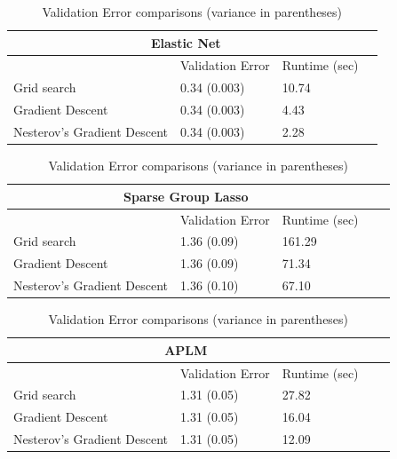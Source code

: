 \documentclass[10pt,letterpaper]{article}
\begin{document}
\begin{table} 
\begin{center}

\begin{tabular}{| l | l | l | l | }
\hline
\multicolumn{3}{|c|}{Elastic Net}\\
\hline
 & Validation Error & Runtime (sec) \\
\hline
Grid search & 0.34 (0.003) & 10.74\\
\hline
Gradient Descent & 0.34 (0.003) & 4.43 \\
\hline
Nesterov's Gradient Descent & 0.34 (0.003) & 2.28 \\
\hline
\end{tabular}


\begin{tabular}{| l | l | l | l | l | }
\hline
\multicolumn{3}{|c|}{Sparse Group Lasso}\\
\hline
 & Validation Error & Runtime (sec) \\
\hline
Grid search & 1.36 (0.09) & 161.29 \\
\hline
Gradient Descent  & 1.36 (0.09) & 71.34 \\
\hline
Nesterov's Gradient Descent  & 1.36 (0.10) & 67.10 \\
\hline
\end{tabular}

\begin{tabular}{| l | l | l | l | l | }
\hline
\multicolumn{3}{|c|}{APLM}\\
\hline
 & Validation Error & Runtime (sec) \\
\hline
Grid search  & 1.31 (0.05) & 27.82 \\
\hline
Gradient Descent  & 1.31 (0.05) & 16.04 \\
\hline
Nesterov's Gradient Descent  & 1.31 (0.05) & 12.09 \\
\hline
\end{tabular}

\end{center}
\caption {Validation Error comparisons (variance in parentheses)}
\label{table:validation}
\end{table}


\end{document}
